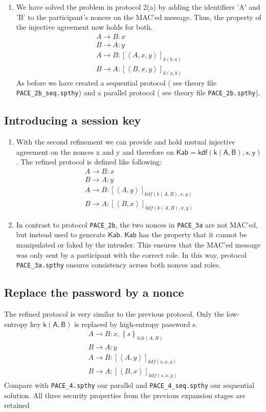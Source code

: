 \documentclass[a4paper,11pt]{scrartcl}
\newcommand{\tuple}[1]{\left\langle #1\right\rangle}
\begin{document}
\begin{enumerate}[label=\alph*)]
	\item We have solved the problem in protocol 2(a) by adding the identifiers 'A' and 'B' to the participant's nonces on the MAC'ed message.  Thus, the property of the 			injective agreement now holds for both.
	\begin{align*}
	A \rightarrow B: x\\
	B \rightarrow A: y\\
	A \rightarrow B: [\tuple{A, x, y}]_{k(b,a)}\\
	B \rightarrow A: [\tuple{B, x, y}]_{k(a,b)}
	\end{align*}
	As before we have created a sequential protocol ( see theory file \texttt{PACE_2b_seq.spthy}) and a parallel protocol ( see theory file \texttt{PACE_2b.spthy}).
\end{enumerate}
\subsection{Introducing a session key}
\begin{enumerate}[label=\alph*)]
	\item With the second refinement we can provide and hold mutual injective agreement on the nonces x and y and therefore on $\mathsf{Kab = kdf(k(A,B),x,y)}$. The refined 		protocol is defined like following:
	\begin{align*}
	A \rightarrow B: x\\
	B \rightarrow A: y\\
	A \rightarrow B: [\tuple{A,  y}]_{kdf(k(A,  B), x, y)}\\
	B \rightarrow A: [\tuple{B,  x}]_{kdf(k(A,  B), x, y)}
	\end{align*}
	\item In contrast to protocol \texttt{PACE_2b}, the two nonces in \texttt{PACE_3a} are not MAC'ed, but instead used to generate $\mathsf{Kab}$.  $\mathsf{Kab}$ has the 				property that it cannot be manipulated or faked by the intruder. This ensures that the MAC'ed message was only sent by a participant with the correct role. In this way,  protocol 	\texttt{PACE_3a.spthy} ensures consistency across both nonces and roles. 
\end{enumerate}
\subsection{Replace the password by a nonce}
The refined protocol is very similar to the previous protocol. Only the low-entropy key $\mathsf{k(A,B)}$ is replaced by high-entropy password s.
	\begin{align*}
	A \rightarrow B: x, \left\lbrace s \right\rbrace_{h(k(A,B)}\\
	B \rightarrow A: y\\
	A \rightarrow B: [\tuple{A,  y}]_{kdf(s, x, y)}\\
	B \rightarrow A: [\tuple{B,  x}]_{kdf(s, x, y)}
	\end{align*}
	Compare with \texttt{PACE_4.spthy} our parallel and \texttt{PACE_4_seq.spthy} our sequential solution.  All three security properties from the previous expansion stages 		are retained
\end{document}

